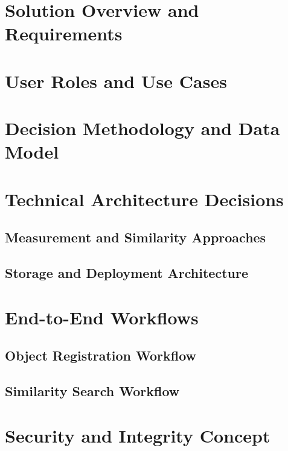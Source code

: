 \section{Solution Overview and Requirements}\label{sec:solution:overview}

\section{User Roles and Use Cases}\label{sec:solution:use-cases}

\section{Decision Methodology and Data Model}\label{sec:solution:data-model}

\section{Technical Architecture Decisions}\label{sec:solution:architecture}

\subsection{Measurement and Similarity Approaches}\label{sec:solution:arch:measurement}

\subsection{Storage and Deployment Architecture}\label{sec:solution:arch:deployment}

\section{End-to-End Workflows}\label{sec:solution:workflows}

\subsection{Object Registration Workflow}\label{sec:solution:workflow:registration}

\subsection{Similarity Search Workflow}\label{sec:solution:workflow:similarity}

\section{Security and Integrity Concept}\label{sec:solution:security}
